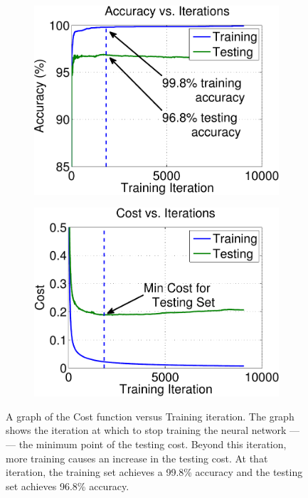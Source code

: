 %
\begin{figure}
\centering
\begin{subfigure}[b]{0.5\columnwidth}
\centering
\includegraphics[width=\columnwidth]{ch5/figs/accu_vs_iter_f20.pdf}
\end{subfigure}%
\begin{subfigure}[b]{0.5\columnwidth}
\centering
\includegraphics[width=\columnwidth]{ch5/figs/cost_vs_iter_f20.pdf}
\end{subfigure}
\caption{A graph of the Cost function versus Training iteration.
The graph shows the iteration at which to stop training the neural network
--- --- the minimum point of the testing cost.
Beyond this iteration, more training causes an increase in the testing cost.
At that iteration, the training set achieves a 99.8\% accuracy and the
testing set achieves 96.8\% accuracy.}
\label{stop_graph}
\end{figure}
